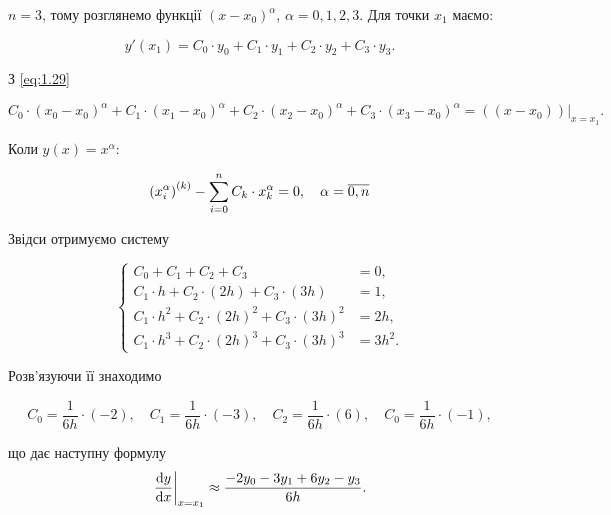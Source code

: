 \begin{solution}
$n = 3$, тому розглянемо функції $(x - x_0)^\alpha$, $\alpha = 0, 1, 2, 3$. Для точки $x_1$ маємо:

\begin{equation*}
	y'(x_1) = C_0 \cdot y_0 + C_1 \cdot y_1 + C_2 \cdot y_2 + C_3 \cdot y_3.
\end{equation*}

З \eqref{eq:1.29}

\begin{equation}
	\label{eq:1.30}
	C_0 \cdot (x_0 - x_0)^\alpha + C_1 \cdot (x_1 - x_0)^\alpha + C_2 \cdot (x_2 - x_0)^\alpha + C_3 \cdot (x_3 - x_0)^\alpha = \left. \left( (x - x_0) \right) \right|_{x = x_1}.
\end{equation}

\begin{remark*}
	Коли $y(x) = x^\alpha$:

	\begin{equation}
		\label{eq:1.29_prime}
		\left( x_i^\alpha \right)^{(k)}  - \displaystyle\sum\limits_{i = 0}^n C_k \cdot x_k^\alpha = 0, \quad \alpha = \overline{0,n}
	\end{equation}
\end{remark*}

Звідси отримуємо систему

\begin{equation*}
	\left\{
		\begin{aligned}
			C_0 + C_1 + C_2 + C_3 &= 0, \\
			C_1 \cdot h + C_2 \cdot (2h) + C_3 \cdot (3h) &= 1, \\
			C_1 \cdot h^2 + C_2 \cdot (2h)^2 + C_3 \cdot (3h)^2 &= 2h, \\
			C_1 \cdot h^3 + C_2 \cdot (2h)^3 + C_3 \cdot (3h)^3 &= 3h^2.
		\end{aligned}
	\right.
\end{equation*}

Розв'язуючи її знаходимо

\begin{equation*}
	C_0 = \frac{1}{6h} \cdot (-2), \quad C_1 = \frac{1}{6h} \cdot (-3), \quad C_2 = \frac{1}{6h} \cdot (6), \quad C_0 = \frac{1}{6h} \cdot (-1), 
\end{equation*}

що дає наступну формулу
\begin{equation*}
	\left. \frac{\mathop{}\!\mathrm{d} y}{\mathop{}\!\mathrm{d} x} \right|_{x = x_1} \approx \frac{-2y_0-3y_1+6y_2-y_3}{6h}.
\end{equation*}
\end{solution}

